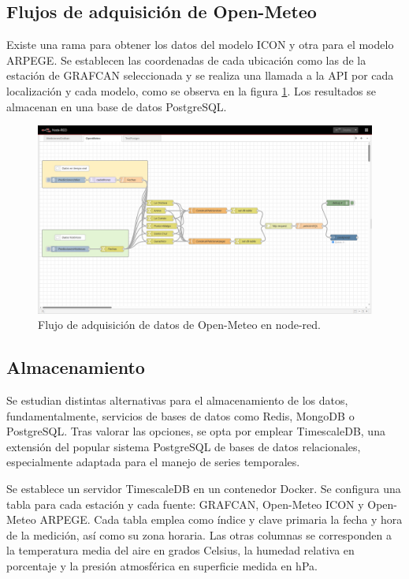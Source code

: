 \subsection{Flujos de adquisición de Open-Meteo}
Existe una rama para obtener los datos del modelo ICON y otra para el modelo ARPEGE. Se establecen las coordenadas de cada ubicación como las de la estación de GRAFCAN seleccionada 
y se realiza una llamada a la API por cada localización y cada modelo, como se observa en la figura \ref{open-meteo_flows}. 
Los resultados se almacenan en una base de datos PostgreSQL.
\begin{figure}[htb]
   \centering
   \includegraphics[width=1\linewidth]{images/node-red_open-meteo.png}
   \caption{Flujo de adquisición de datos de Open-Meteo en node-red.}
   \label{open-meteo_flows}
\end{figure}

\subsection{Almacenamiento}
Se estudian distintas alternativas para el almacenamiento de los datos, fundamentalmente, servicios de bases de datos como Redis, MongoDB o PostgreSQL.
Tras valorar las opciones, se opta por emplear TimescaleDB, una extensión del popular sistema PostgreSQL
de bases de datos relacionales, especialmente adaptada para el manejo de series temporales. 

Se establece un servidor TimescaleDB en un contenedor Docker. Se configura una tabla para cada estación y cada fuente: GRAFCAN, Open-Meteo ICON y Open-Meteo ARPEGE. 
Cada tabla emplea como índice y clave primaria la fecha y hora de la medición, así como su zona horaria. Las otras columnas se corresponden a la temperatura media del aire
 en grados Celsius, la humedad relativa en porcentaje y la presión atmosférica en superficie medida en hPa.

